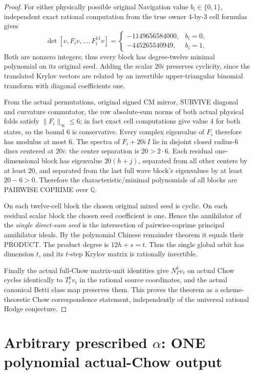 \documentclass[11pt]{article}
\begin{document}
\begin{proof}
For either physically possible original Navigation value
$b_i\in\{0,1\}$, independent exact rational computation
from the true owner 4-by-3 cell formulas gives
\[
\det[v,F_iv,\ldots,F_i^{11}v]=
\begin{cases}
-1149656584000,&b_i=0,\\
-445265540949,&b_i=1.
\end{cases}
\]
Both are nonzero integers; thus every block has
degree-twelve minimal polynomial on its original seed.
Adding the scalar $20i$ preserves cyclicity, since
the translated Krylov vectors are related by
an invertible upper-triangular binomial transform
with diagonal coefficients one.

From the actual permutations, original signed CM mirror,
SURVIVE diagonal and curvature commutator, the row
absolute-sum norms of both actual physical folds
satisfy $\|F_i\|_\infty\le6$;
in fact exact cell computations give value $4$
for both states, so the bound $6$ is conservative.
Every complex eigenvalue of $F_i$ therefore
has modulus at most $6$.
The spectra of $F_i+20i\,I$ lie in disjoint
closed radius-$6$ discs centered at $20i$:
the center separation is $20>2\cdot6$.
Each residual one-dimensional block has eigenvalue
$20(h+j)$, separated from all other centers by
at least $20$, and separated from the last full
wave block's eigenvalues by at least $20-6>0$.
Therefore the characteristic/minimal polynomials
of all blocks are PAIRWISE COPRIME over $\mathbb Q$.

On each twelve-cell block the chosen original
mixed seed is cyclic. On each residual scalar
block the chosen seed coefficient is one.
Hence the annihilator of the \emph{single direct-sum
seed} is the intersection of pairwise-coprime
principal annihilator ideals. By the polynomial
Chinese remainder theorem it equals their PRODUCT.
The product degree is $12h+s=t$.
Thus the single global orbit has dimension $t$,
and its $t$-step Krylov matrix is rationally invertible.

Finally the actual full-Chow matrix-unit identities
give $N_{\Gamma}^kv_t$ on actual Chow cycles
identically to $T_t^kv_t$ in the rational source coordinates,
and the actual canonical Betti class map preserves them.
This proves the theorem as a scheme-theoretic
Chow correspondence statement, independently of
the universal rational Hodge conjecture.
\end{proof}

\section{Arbitrary prescribed $\alpha$: ONE polynomial actual-Chow output}
\end{document}
